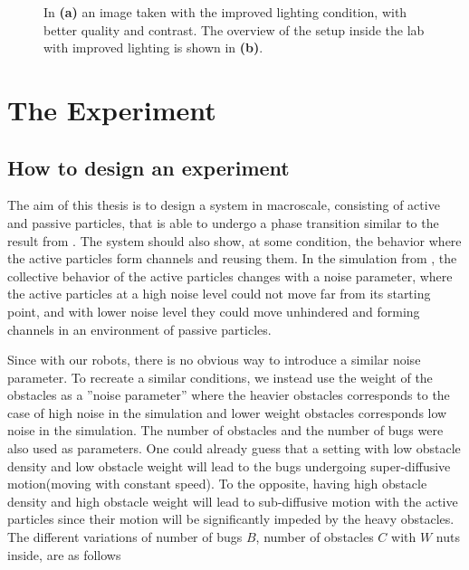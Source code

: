 \begin{figure}[htpb!]
    \centering
    \caption{In \textbf{(a)} an image taken with the improved lighting condition, with better quality 
    and contrast. The overview of the setup inside the lab with improved lighting is shown in \textbf{(b)}.}
    \label{fig:good_conditions}
\end{figure}


\section{The Experiment}

\subsection{How to design an experiment}

The aim of this thesis is to design a system in macroscale, consisting of active and passive particles, that 
is able to undergo a phase transition similar to the result from \cite{nilsson2017metastable}. The system 
should also show, at some condition, the behavior where the active particles form channels and reusing them.
In the simulation from \cite{nilsson2017metastable}, the collective behavior of the active particles changes 
with a noise parameter, where the active particles at a high noise level could not move far from its starting point, 
and with lower noise level they could move unhindered and forming channels in an environment of passive particles. 

Since with our robots, there is no obvious way to introduce a similar noise parameter. To recreate a similar 
conditions, we instead use the weight of the obstacles as a ''noise parameter'' where the heavier obstacles 
corresponds to the case of high noise in the simulation and lower weight obstacles corresponds low noise in the simulation. 
The number of obstacles and the number of bugs were also used as parameters. One could already guess that 
a setting with low obstacle density and low obstacle weight will lead to the bugs undergoing super-diffusive motion(moving with constant speed). 
To the opposite, having high obstacle density and high obstacle weight will lead to sub-diffusive motion with the active particles 
since their motion will be significantly impeded by the heavy obstacles.
The different variations of number of bugs $B$, number of obstacles $C$ with $W$ nuts inside, are as follows


